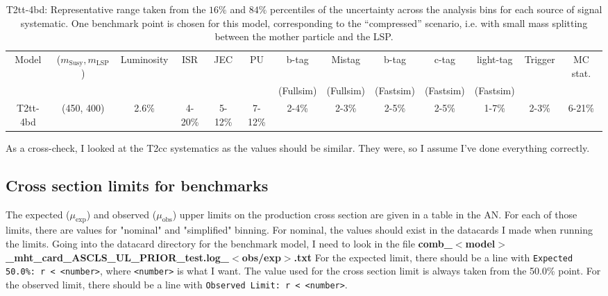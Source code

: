 \begin{landscape}
\begin{table}[H]
    \label{tab:T2tt-4bdSUS16038systs}
    \centering
    \small
    \begin{tabular}{ ccccccccccccc }
        \hline \hline
        Model & ($m_{\mathrm{Susy}},m_{\mathrm{LSP}}$) & Luminosity & ISR & JEC & PU & b-tag & Mistag & b-tag & c-tag & light-tag & Trigger & MC stat. \\
        & & & & & & (Fullsim) & (Fullsim) & (Fastsim) & (Fastsim) & (Fastsim) & & \\ \hline
        T2tt-4bd & (450, 400) & 2.6\% & 4-20\% & 5-12\% & 7-12\% & 2-4\% & 2-3\% & 2-5\% & 2-5\% & 1-7\% & 2-3\% & 6-21\% \\
        \hline \hline
        \end{tabular}
    \caption{T2tt-4bd: Representative range taken from the $16\%$ and $84\%$ percentiles of the uncertainty across the analysis bins for each source of signal systematic. One benchmark point is chosen for this model, corresponding to the ``compressed'' scenario, i.e. with small mass splitting between the mother particle and the LSP.}
\end{table}
\end{landscape}

As a cross-check, I looked at the T2cc systematics as the values should be similar. They were, so I assume I've done everything correctly.



\subsection{Cross section limits for benchmarks}

The expected ($\mu_{\mathrm{exp}}$) and observed ($\mu_{\mathrm{obs}}$) upper limits on the production cross section are given in a table in the AN. For each of those limits, there are values for "nominal" and "simplified" binning. For nominal, the values should exist in the datacards I made when running the limits. Going into the datacard directory for the benchmark model, I need to look in the file \textbf{comb\_$<$model$>$\_mht\_card\_ASCLS\_UL\_PRIOR\_test.log\_$<$obs/exp$>$.txt} For the expected limit, there should be a line with \texttt{Expected 50.0\%: r < <number>}, where \texttt{<number>} is what I want. The value used for the cross section limit is always taken from the 50.0\% point. For the observed limit, there should be a line with \texttt{Observed Limit: r < <number>}.

